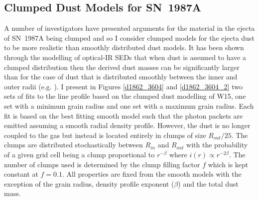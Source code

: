 \subsection{Clumped Dust Models for SN~1987A}
\label{clumped_models}

A number of investigators have presented arguments for the material in the 
ejecta of SN~1987A being clumped \citep{Lucy1991,Li1992,Kozma1998b} and so 
I consider clumped models for the ejecta dust to be more realistic than 
smoothly distributed dust models. It has been shown through the modelling 
of optical-IR SEDs that when dust is assumed to have a clumped 
distribution then the derived dust masses can be significantly larger than 
for the case of dust that is distributed smoothly between the inner and 
outer radii (e.g. \citet{Ercolano2007,Owen2015}). I present in Figures \ref{d1862_3604} and \ref{d1862_3604_2} two sets of 
fits to the line profile based on the clumped dust modelling of W15, one 
set with a minimum grain radius and one set with a maximum grain radius.  
Each fit is based on the best fitting smooth model such that the photon 
packets are emitted assuming a smooth radial density profile.  However, 
the dust is no longer coupled to the gas but instead is located entirely 
in clumps of size $R_{out}/25$.  The clumps are distributed stochastically 
between $R_{in}$ and $R_{out}$ with the probability of a given grid cell 
being a clump proportional to $r^{- \beta }$ where $i(r) \propto r^{-2 
\beta}$.  The number of clumps used is determined by the clump filling 
factor $f$ which is kept constant at $f=0.1$.  All properties are fixed 
from the smooth models with the exception of the grain radius, density 
profile exponent ($\beta$) and the total dust mass.

